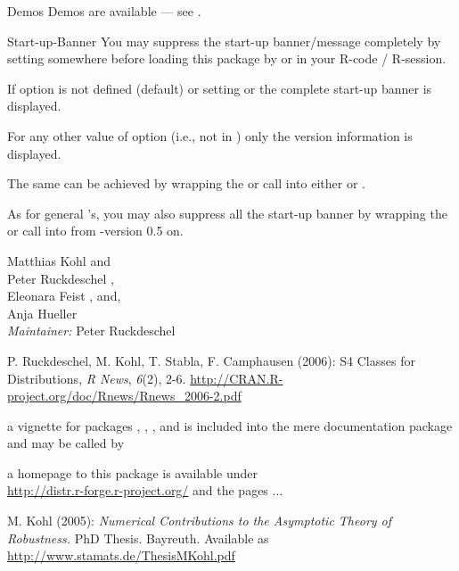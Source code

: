 \documentclass{article}
\begin{document}
\begin{Section}{Demos}
Demos are available --- see .
\end{Section}
\begin{Section}{Start-up-Banner}
You may suppress the start-up banner/message completely by setting 
 somewhere before loading this package by 
 or  in your R-code / R-session.

If option  is not defined (default) or setting    
 or 
 the complete start-up banner is 
displayed.

For any other value of option  (i.e., not in 
) only the version information is displayed.

The same can be achieved by wrapping the  or   call 
into either  or 
.  

As for general 's, you may also suppress all
the start-up banner by wrapping the  or  
call into  from 
-version 0.5 on.
\end{Section}
\begin{Author}\relax
Matthias Kohl  and \\
Peter Ruckdeschel ,\\ 
Eleonara Feist , and, \\
Anja Hueller \\  

\emph{Maintainer:}  Peter Ruckdeschel 
\end{Author}
\begin{References}\relax
P. Ruckdeschel, M. Kohl, T. Stabla, F. Camphausen (2006):
S4 Classes for Distributions, {\em R News}, {\em 6}(2), 2-6. 
\url{http://CRAN.R-project.org/doc/Rnews/Rnews_2006-2.pdf}


a vignette for packages , , , 
and  is included into the mere documentation package  
and may be called by 

a homepage to this package is available under\\
\url{http://distr.r-forge.r-project.org/} and the pages ...

M. Kohl (2005): \emph{Numerical Contributions to the Asymptotic 
Theory of Robustness.} PhD Thesis. Bayreuth. Available as 
\url{http://www.stamats.de/ThesisMKohl.pdf}
\end{References}
\begin{SeeAlso}\relax
{} 
\end{SeeAlso}
\end{document}
